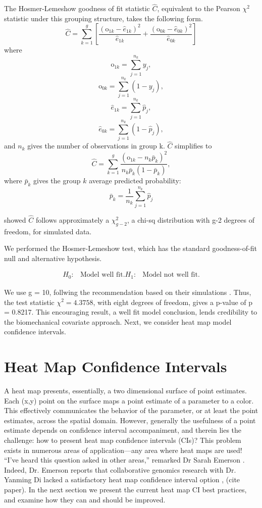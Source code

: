 The Hosmer-Lemeshow goodness of fit statistic $\hat{C}$, equivalent to the Pearson $\chi^{2}$ statistic under this grouping structure, takes the following form.
$$ \widehat{C} = \sum_{k=1}^{g} \left[ \frac{(\text{o}_{1k}-\hat{e}_{1k})^{2}}{\hat{e}_{1k}} + \frac{(\text{o}_{0k}-\hat{e}_{0k})^{2}}{\hat{e}_{0k}}  \right] $$
where
$$ \text{o}_{1k} =  \sum_{j=1}^{n_{k}}y_{j},$$
$$ \text{o}_{0k} =  \sum_{j=1}^{n_{k}}(1-y_{j}),$$
$$ \hat{e}_{1k} = \sum_{j=1}^{n_{k}}\hat{p}_{j},$$
$$ \hat{e}_{0k} = \sum_{j=1}^{n_{k}}(1-\hat{p}_{j}),$$
and $n_{k}$ gives the number of observations in group k. $\widehat{C}$ simplifies to
$$ \widehat{C} = \sum_{k=1}^{g} \frac{(\text{o}_{1k}-n_{k}\bar{p}_{k})^{2}}{n_{k}\bar{p}_{k}(1-\bar{p}_{k})},$$
where $\bar{p}_{k}$ gives the group $k$ average predicted probability:
$$\bar{p}_{k} = \frac{1}{n_{k}}\sum_{j=1}^{n_{k}}\hat{p}_{j}$$

\cite{Hosmer1980} showed $\widehat{C}$ follows approximately a $\chi^{2}_{g-2}$, a chi-sq distribution with g-2 degrees of freedom, for simulated data. 

We performed the Hosmer-Lemeshow test, which has the standard goodness-of-fit null and alternative hypothesis.

\begin{align}
H_{0}: & \text{Model well fit.}
H_{1}: & \text{Model not well fit.}
\end{align}

We use g = 10, follwing the \cite{Hosmer2013} recommendation based on their simulations \cite{Hosmer1980}. Thus, the test statistic $\chi^{2} = 4.3758$, with eight degrees of freedom, gives a p-value of p = 0.8217. This encouraging result, a well fit model conclusion, lends credibility to the biomechanical covariate approach. Next, we consider heat map model confidence intervals.

\section{Heat Map Confidence Intervals}

A heat map presents, essentially, a two dimensional surface of point estimates. Each (x,y) point on the surface maps a point estimate of a parameter to a color. This effectively communicates the behavior of the parameter, or at least the point estimates, across the spatial domain. However, generally the usefulness of a point estimate depends on confidence interval accompaniment, and therein lies the challenge: how to present heat map confidence intervals (CIs)? This problem exists in numerous areas of application---any area where heat maps are used! ``I've heard this question asked in other areas,'' remarked Dr Sarah Emerson \citep{Emerson}. Indeed, Dr. Emerson reports that collaborative genomics research with Dr. Yanming Di lacked a satisfactory heat map confidence interval option \citep{Emerson}, (cite paper). In the next section we present the current heat map CI best practices, and examine how they can and should be improved.

